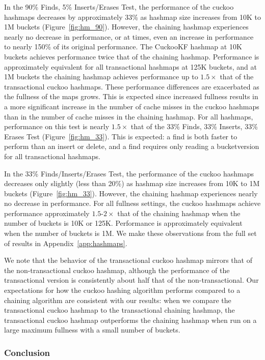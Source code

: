 In the 90\% Finds, 5\% Inserts/Erases Test, the performance of the cuckoo hashmaps decreases by approximately 33\% as hashmap size increases from 10K to 1M buckets (Figure~\ref{fig:hm_90}). However, the chaining hashmap experiences nearly no decrease in performance, or at times, even an increase in performance to nearly 150\% of its original performance. The CuckooKF hashmap at 10K buckets achieves performance twice that of the chaining hashmap. Performance is approximately equivalent for all transactional hashmaps at 125K buckets, and at 1M buckets the chaining hashmap achieves performance up to $1.5\times$ that of the transactional cuckoo hashmaps. These performance differences are exacerbated as the fullness of the maps grows. This is expected since increased fullness results in a more significant increase in the number of cache misses in the cuckoo hashmaps than in the number of cache misses in the chaining hashmap.
 For all hashmaps, performance on this test is nearly $1.5\times$ that of the 33\% Finds, 33\% Inserts, 33\% Erases Test (Figure~\ref{fig:hm_33}). This is expected: a find is both faster to perform than an insert or delete, and a find requires only reading a bucketversion for all transactional hashmaps.

In the 33\% Finds/Inserts/Erases Test, the performance of the cuckoo hashmaps decreases only slightly (less than 20\%) as hashmap size increases from 10K to 1M buckets (Figure~\ref{fig:hm_33}). However, the chaining hashmap experiences nearly no decrease in performance. For all fullness settings, the cuckoo hashmaps achieve performance approximately $1.5$-$2\times$ that of the chaining hashmap when the number of buckets is 10K or 125K. Performance is approximately equivalent when the number of buckets is 1M. We make these observations from the full set of results in Appendix~\ref{app:hashmaps}.

We note that the behavior of the transactional cuckoo hashmap mirrors that of the non-transactional cuckoo hashmap, although the performance of the transactional version is consistently about half that of the non-transactional. Our expectations for how the cuckoo hashing algorithm performs compared to a chaining algorithm are consistent with our results: when we compare the transactional cuckoo hashmap to the transactional chaining hashmap, the transactional cuckoo hashmap outperforms the chaining hashmap when run on a large maximum fullness with a small number of buckets. 

\subsubsection{Conclusion}

